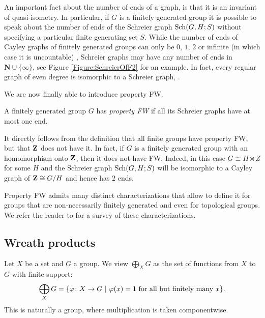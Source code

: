 An important fact about the number of ends of a graph, is that it is an invariant of quasi-isometry. In particular, if $G$ is a finitely generated group it is possible to speak about the number of ends of the Schreier graph $\operatorname{Sch}(G,H;S)$ without specifying a particular finite generating set $S$.
While the number of ends of Cayley graphs of finitely generated groups can only be $0$, $1$, $2$ or infinite (in which case it is uncountable) \cite[Theorem 11.27]{Stallings1971}, Schreier graphs may have any number of ends in $\mathbf N\cup\{\infty\}$, see Figure \ref{Figure:SchreierOfF2} for an example.
In fact, every regular graph of even degree is isomorphic to a Schreier graph, \cite{MR0450121,MR1358635}.

We are now finally able to introduce property FW.
%
%
\begin{defn}
A finitely generated group $G$ has \emph{property FW} if all its Schreier graphs have at most one end.
\end{defn}
%
%
It directly follows from the definition that all finite groups have property FW, but that $\mathbf{Z}$ does not have it.
In fact, if $G$ is a finitely generated group with an homomorphism onto $\mathbf{Z}$, then it does not have FW. Indeed, in this case $G\cong H\rtimes Z$ for some $H$ and the Schreier graph $\operatorname{Sch}(G,H;S)$ will be isomorphic to a Cayley graph of $\mathbf{Z}\cong G/H$ and hence has $2$ ends.

Property FW admits many distinct characterizations that allow to define it for groups that are non-necessarily finitely generated and even for topological groups. We refer the reader to \cite{Cornulier2013} for a survey of these characterizations.
%
%
%
%
%
%
%
%
%
%
\subsection{Wreath products}
%
%
%
%
%
Let $X$ be a set and $G$ a group. We view 
$\bigoplus_XG$ as the set of functions from $X$ to $G$ with finite support:
\[
	\bigoplus_XG=\{\varphi\colon X\to G\ |\ \varphi(x)=1 \textnormal{ for all but finitely many }x\}.
\]
This is naturally a group, where multiplication is taken componentwise.

